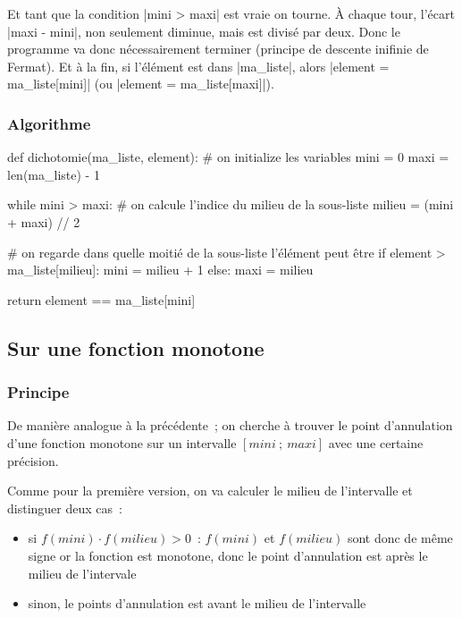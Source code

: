 		Et tant que la condition \python|mini > maxi| est vraie on tourne. À chaque tour, l'écart \python|maxi - mini|, non seulement diminue, mais est divisé par deux. Donc le programme va donc nécessairement terminer (principe de descente inifinie de Fermat). Et à la fin, si l'élément est dans \python|ma_liste|, alors \python|element = ma_liste[mini]| (ou \python|element = ma_liste[maxi]|).
		
		\subsubsection{Algorithme}
		
		\begin{pythoncode}
			def dichotomie(ma_liste, element):
				# on initialize les variables
				mini = 0
				maxi = len(ma_liste) - 1
				
				while mini > maxi:
					# on calcule l'indice du milieu de la sous-liste
					milieu = (mini + maxi) // 2
					
					# on regarde dans quelle moitié de la sous-liste l'élément peut être
					if element > ma_liste[milieu]:
						mini = milieu + 1
					else:
						maxi = milieu
				
				return element == ma_liste[mini]
		\end{pythoncode}
	
	\subsection{Sur une fonction monotone}
		
		\subsubsection{Principe}
		
		De manière analogue à la précédente~; on cherche à trouver le point d'annulation d'une fonction monotone sur un intervalle $[mini~;\ maxi]$ avec une certaine précision.
		
		Comme pour la première version, on va calculer le milieu de l'intervalle et distinguer deux cas~:
		\begin{itemize}
			\item si $f(mini) \cdot f(milieu) > 0$~: $f(mini)$ et $f(milieu)$ sont donc de même signe or la fonction est monotone, donc le point d'annulation est après le milieu de l'intervale
			\item sinon, le points d'annulation est avant le milieu de l'intervalle
		\end{itemize} \ \\
		
